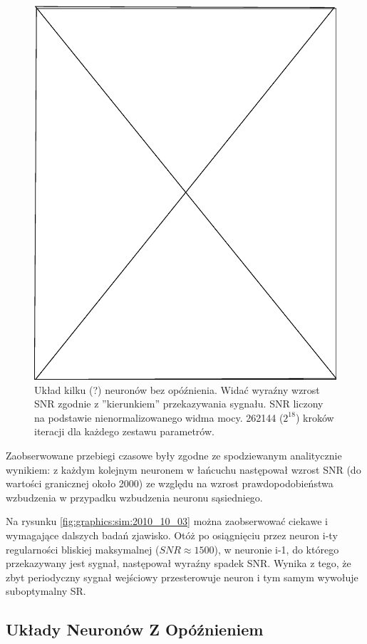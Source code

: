   \begin{figure}
    \includegraphics[width=120mm]{images/pending}
    \caption{Układ kilku (?) neuronów bez opóźnienia. Widać wyraźny wzrost SNR zgodnie z ''kierunkiem'' przekazywania sygnału. SNR liczony na podstawie nienormalizowanego widma mocy. 262144 ($2^{18}$) kroków iteracji dla każdego zestawu parametrów.}
    \label{fig:graphics:sim:x}
  \end{figure}

  Zaobserwowane przebiegi czasowe były zgodne ze spodziewanym analitycznie wynikiem: z każdym kolejnym neuronem w łańcuchu następował wzrost SNR (do wartości granicznej około 2000) ze względu na wzrost prawdopodobieństwa wzbudzenia w przypadku wzbudzenia neuronu sąsiedniego.

  Na rysunku \ref{fig:graphics:sim:2010_10_03} można zaobserwować ciekawe i wymagające dalszych badań zjawisko. Otóż po osiągnięciu przez neuron i-ty regularności bliskiej maksymalnej ($SNR \approx 1500$), w neuronie i-1, do którego przekazywany jest sygnał, następował wyraźny spadek SNR. Wynika z tego, że zbyt periodyczny sygnał wejściowy przesterowuje neuron i tym samym wywołuje suboptymalny SR.

  
  \subsection{Układy Neuronów Z Opóźnieniem}
  
